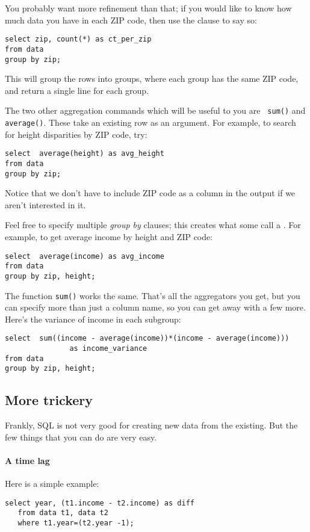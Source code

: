 You probably want more refinement than that; if you would like to
know how much data you have in each ZIP code, then use the  clause to say so:
\begin{verbatim}
select zip, count(*) as ct_per_zip
from data
group by zip;
\end{verbatim}
This will group the rows into groups, where each group has the same ZIP
code, and return a single line for each group.


The two other aggregation commands which will be useful to you are {\tt
sum()} and {\tt average()}. These take an existing row as an argument.
For example, to search for height disparities by ZIP code, try:
\begin{verbatim}
select  average(height) as avg_height
from data
group by zip;
\end{verbatim}
Notice that we don't have to include ZIP code as a column in the output
if we aren't interested in it.

Feel free to specify multiple {\sl group by} clauses; this creates what
some call a . For example, to get average income by
height and ZIP code: 
\begin{verbatim}
select  average(income) as avg_income
from data
group by zip, height;
\end{verbatim}

The function {\tt sum()} works the same. That's all the aggregators you
get, but you can specify more than just a column name, so you can get
away with a few more. Here's the variance of income in each subgroup:
\begin{verbatim}
select  sum((income - average(income))*(income - average(income))) 
               as income_variance
from data
group by zip, height;
\end{verbatim}

\subsection{More trickery} Frankly, SQL is not very good for
creating new data from the existing. But the few things that you can do
are very easy.

\paragraph{A time lag} Here is a simple example:
\begin{verbatim}
select year, (t1.income - t2.income) as diff
   from data t1, data t2
   where t1.year=(t2.year -1);
\end{verbatim}

